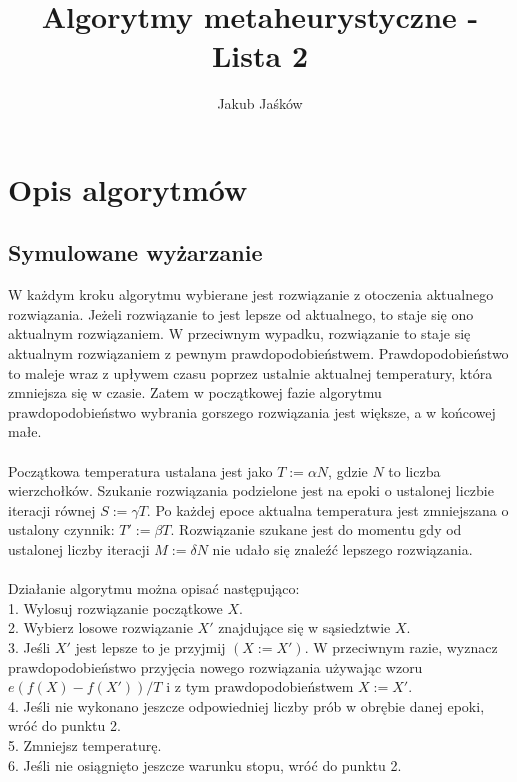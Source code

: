 \documentclass{article}
\begin{document}
    \title{Algorytmy metaheurystyczne - Lista 2}
    \author{Jakub Jaśków}

    \maketitle

\section*{Opis algorytmów}
\subsection*{Symulowane wyżarzanie}
W każdym kroku algorytmu wybierane jest rozwiązanie z otoczenia aktualnego rozwiązania. Jeżeli rozwiązanie to jest lepsze od aktualnego, to staje się ono aktualnym rozwiązaniem. W przeciwnym wypadku, rozwiązanie to staje się aktualnym rozwiązaniem z pewnym prawdopodobieństwem. Prawdopodobieństwo to maleje wraz z upływem czasu poprzez ustalnie aktualnej temperatury, która zmniejsza się w czasie. Zatem w początkowej fazie algorytmu prawdopodobieństwo wybrania gorszego rozwiązania jest większe, a w końcowej małe.\\\\
Początkowa temperatura ustalana jest jako $T := \alpha N$, gdzie $N$ to liczba wierzchołków.
Szukanie rozwiązania podzielone jest na epoki o ustalonej liczbie iteracji równej $S := \gamma T$. Po każdej epoce aktualna temperatura jest zmniejszana o ustalony czynnik: $T' := \beta T$.
Rozwiązanie szukane jest do momentu gdy od ustalonej liczby iteracji $M := \delta N$ nie udało się znaleźć lepszego rozwiązania.\\\\
Działanie algorytmu można opisać następująco:\\
1. Wylosuj rozwiązanie początkowe $X$.\\
2. Wybierz losowe rozwiązanie $X\prime$ znajdujące się w sąsiedztwie $X$.\\
3. Jeśli $X\prime$ jest lepsze to je przyjmij $(X := X\prime)$. W przeciwnym razie, wyznacz prawdopodobieństwo przyjęcia nowego rozwiązania używając wzoru $e(f (X)-f (X\prime))/T$ i z tym prawdopodobieństwem $X := X\prime$.\\
4. Jeśli nie wykonano jeszcze odpowiedniej liczby prób w obrębie danej epoki, wróć do punktu 2.\\
5. Zmniejsz temperaturę.\\
6. Jeśli nie osiągnięto jeszcze warunku stopu, wróć do punktu 2.\\
\end{document}
